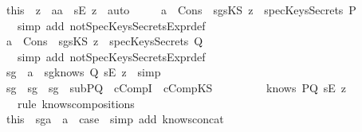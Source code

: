 \begin{isabellebody}
\ \ \ \ \isamarkupfalse \ this\ \isamarkupfalse \ z\ \ a{}{\isacharcolon}{\isachardoublequoteopen}a\ {\isacharequal}\ {\isacharparenleft}sE\ z{\isacharparenright}{\isachardoublequoteclose}\ \isamarkupfalse \ auto\isanewline
\ \ \ \ \isamarkupfalse \ a{}\ \ Cons\ \isamarkupfalse \ sg{}{\isacharcolon}{\isachardoublequoteopen}{\isacharparenleft}sKS\ z{\isacharparenright}\ {\isasymnotin}\ specKeysSecrets\ P{\isachardoublequoteclose}\isanewline
\ \ \ \ \ \ \isamarkupfalse \ {\isacharparenleft}simp\ add{\isacharcolon}\ notSpecKeysSecretsExpr{\isacharunderscore}def{\isacharparenright}\isanewline
\ \ \ \ \isamarkupfalse \ a{}\ \ Cons\ \isamarkupfalse \ sg{}{\isacharcolon}{\isachardoublequoteopen}{\isacharparenleft}sKS\ z{\isacharparenright}\ {\isasymnotin}\ specKeysSecrets\ Q{\isachardoublequoteclose}\isanewline
\ \ \ \ \ \ \isamarkupfalse \ {\isacharparenleft}simp\ add{\isacharcolon}\ notSpecKeysSecretsExpr{\isacharunderscore}def{\isacharparenright}\isanewline
\ \ \ \ \isamarkupfalse \ sg{}\ \ a{}\ \isamarkupfalse \ sg{}{}{\isacharcolon}{\isachardoublequoteopen}knows\ Q\ {\isacharbrackleft}sE\ z{\isacharbrackright}{\isachardoublequoteclose}\ \isamarkupfalse \ simp\ \isanewline
\ \ \ \ \isamarkupfalse \ sg{}\ \ sg{}\ \ sg{}{}\ \ subPQ\ \ cCompI\ \ cCompKS\ \ \isanewline
\ \ \ \ \ \ \isamarkupfalse \ {\isachardoublequoteopen}knows\ PQ\ {\isacharbrackleft}sE\ z{\isacharbrackright}{\isachardoublequoteclose}\ \isanewline
\ \ \ \ \ \ \isamarkupfalse \ {\isacharparenleft}rule\ knows{\isacharunderscore}composition{}{\isacharunderscore}s{\isacharparenright}\isanewline
\ \ \ \ \isamarkupfalse \ this\ \ sg{}a\ \ a{}\ \isamarkupfalse \ {\isacharquery}case\ \isamarkupfalse \ {\isacharparenleft}simp\ add{\isacharcolon}\ knows{\isacharunderscore}concat{\isacharunderscore}{}{\isacharparenright}\isanewline
\ \ \isamarkupfalse \ \isanewline
{}\isamarkupfalse \endisatagproof
{\isafoldproof}\isadelimproof

\end{isabellebody}
